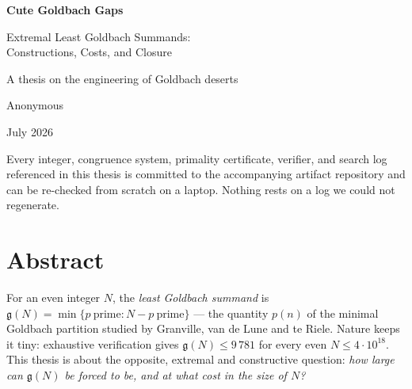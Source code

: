 \documentclass[11pt,oneside]{report}
\theoremstyle{plain}
\theoremstyle{definition}
\theoremstyle{remark}
\newcommand{\N}{N}
\newcommand{\g}{\mathfrak{g}}
\begin{document}
\begin{titlepage}
\centering
\vspace*{4em}
{\Huge\bfseries Cute Goldbach Gaps\par}
\vspace{1.5em}
{\Large Extremal Least Goldbach Summands:\\ Constructions, Costs, and Closure\par}
\vspace{4em}
{\large A thesis on the engineering of Goldbach deserts\par}
\vspace{6em}
{\large Anonymous\par}
\vspace{1em}
{\large July 2026\par}
\vfill
\begin{minipage}{0.8\textwidth}\small\centering
Every integer, congruence system, primality certificate, verifier, and
search log referenced in this thesis is committed to the accompanying
artifact repository and can be re-checked from scratch on a laptop.
Nothing rests on a log we could not regenerate.
\end{minipage}
\vspace*{3em}
\end{titlepage}

\chapter*{Abstract}

For an even integer $\N$, the \emph{least Goldbach summand} is
$\g(\N)=\min\{p\ \text{prime}:\N-p\ \text{prime}\}$ --- the quantity $p(n)$ of
the minimal Goldbach partition studied by Granville, van de Lune and te
Riele. Nature keeps it tiny: exhaustive verification gives
$\g(\N)\le9\,781$ for every even $\N\le4\cdot10^{18}$. This thesis is about
the opposite, extremal and constructive question: \emph{how large can
$\g(\N)$ be forced to be, and at what cost in the size of $\N$?}
\end{document}
